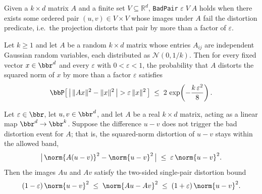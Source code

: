 \begin{definition}
\label{BadPair}
\leanok
{}
Given a $k \times d$ matrix $A$ and a finite set
$V \subseteq \mathbb{R}^d$, \texttt{BadPair} $\varepsilon\; V\; A$ holds when
there exists some ordered pair $(u, v) \in V \times V$ whose images under $A$
fail the distortion predicate, i.e.\ the projection distorts that pair by
more than a factor of $\varepsilon$.
\end{definition}

\begin{theorem}
\label{jl_concentration_single}
\leanok
{}
Let $k \ge 1$ and let $A$ be a random $k \times d$ matrix whose entries $A_{ij}$ are
independent Gaussian random variables, each distributed as $\mathcal{N}(0, 1/k)$. Then
for every fixed vector $x \in \bbr^d$ and every $\varepsilon$ with $0 < \varepsilon <
1$, the probability that $A$ distorts the squared norm of $x$ by more than a factor
$\varepsilon$ satisfies
\[
  \bbP\!\left[\, \bigl|\,\|Ax\|^2 - \|x\|^2\,\bigr| > \varepsilon\,\|x\|^2 \,\right]
  \;\le\; 2\,\exp\!\left(-\frac{k\,\varepsilon^2}{8}\right).
\]
\end{theorem}

\begin{lemma}
\label{JLDistortion.of_not_bad}
\leanok
{}
Let $\varepsilon \in \bbr$, let $u, v \in \bbr^d$, and let $A$ be a real $k \times d$
matrix, acting as a linear map $\bbr^d \to \bbr^k$. Suppose the difference $u - v$ does
not trigger the bad distortion event for $A$; that is, the squared-norm distortion of
$u-v$ stays within the allowed band,
\[
  \bigl|\,\norm{A(u-v)}^2 - \norm{u-v}^2\,\bigr| \;\le\; \varepsilon\,\norm{u-v}^2 .
\]
Then the images $Au$ and $Av$ satisfy the two-sided single-pair distortion bound
\[
(1 - \varepsilon)\,\norm{u - v}^2 \;\le\; \norm{Au - Av}^2 \;\le\; (1 +
\varepsilon)\,\norm{u - v}^2 .
\]
\end{lemma}

